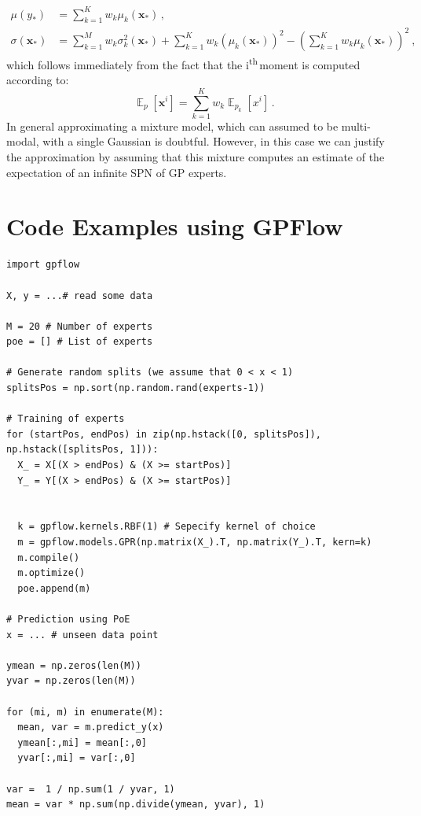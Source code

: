 \documentclass[10pt,letterpaper]{article}
\newcommand{\ths}{\textsuperscript{th}{\,}}
\DeclareMathOperator{\E}{\mathbb{E}}
\newcommand{\x}{\mathbf{x}}
\newcommand{\new}{_{*}}
\theoremstyle{mystyle}
\begin{document}
\begin{align}
  \mu(y\new) &= \sum_{k=1}^K w_k \mu_k(\x\new) \, , \\
  \sigma(\x\new) &= \sum_{k=1}^M w_k \sigma^2_k(\x\new) + \sum_{k=1}^K w_k (\mu_k(\x\new))^2 - \left(\sum_{k=1}^K w_k \mu_k(\x\new)\right)^2\ ,
\end{align}
which follows immediately from the fact that the i\ths moment is computed according to:
\[
  \E_{p}[\x^i] = \sum_{k=1}^K w_k \E_{p_k}[x^i] \, .
\]
In general approximating a mixture model, which can assumed to be multi-modal, with a single Gaussian is doubtful.
However, in this case we can justify the approximation by assuming that this mixture computes an estimate of the expectation of an infinite SPN of GP experts.

\appendix
\section{Code Examples using GPFlow}
\lstset{language=Python}
\lstset{frame=lines}
\lstset{basicstyle=\footnotesize}
\begin{lstlisting}
import gpflow

X, y = ...# read some data

M = 20 # Number of experts
poe = [] # List of experts

# Generate random splits (we assume that 0 < x < 1)
splitsPos = np.sort(np.random.rand(experts-1))

# Training of experts
for (startPos, endPos) in zip(np.hstack([0, splitsPos]), np.hstack([splitsPos, 1])):
  X_ = X[(X > endPos) & (X >= startPos)]
  Y_ = Y[(X > endPos) & (X >= startPos)]


  k = gpflow.kernels.RBF(1) # Sepecify kernel of choice
  m = gpflow.models.GPR(np.matrix(X_).T, np.matrix(Y_).T, kern=k)
  m.compile()
  m.optimize()
  poe.append(m)
    
# Prediction using PoE
x = ... # unseen data point    
    
ymean = np.zeros(len(M))
yvar = np.zeros(len(M))

for (mi, m) in enumerate(M):
  mean, var = m.predict_y(x)
  ymean[:,mi] = mean[:,0]
  yvar[:,mi] = var[:,0]
            
var =  1 / np.sum(1 / yvar, 1)
mean = var * np.sum(np.divide(ymean, yvar), 1)
\end{lstlisting}

\printbibliography
\end{document}
